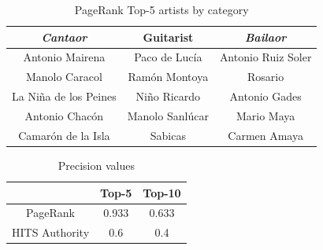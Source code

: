 \begin{table}[!ht]
    \centering
    \begin{tabular}{|c|c|c|}
    \hline
    \textit{Cantaor} & Guitarist & \textit{Bailaor} \\
    \hline
Antonio Mairena & Paco de Luc\'{i}a & Antonio Ruiz Soler \\
Manolo Caracol & Ram\'{o}n Montoya & Rosario \\
La Ni\~{n}a de los Peines & Ni\~{n}o Ricardo & Antonio Gades \\
Antonio Chac\'{o}n & Manolo Sanl\'{u}car & Mario Maya \\
Camar\'{o}n de la Isla & Sabicas & Carmen Amaya \\
    \hline
    \end{tabular}
    \caption{PageRank Top-5 artists by category}    
    \label{tbl:musicology:pagerank}
\end{table}



\begin{table}[!ht]
    \centering
    \begin{tabular}{|c|c|c|}
    \hline
    & Top-5 & Top-10 \\
    \hline
    PageRank & 0.933 & 0.633 \\
    HITS Authority & 0.6 & 0.4 \\
    \hline
    \end{tabular}
    \caption{Precision values}    
    \label{tbl:musicology:experts_results}
\end{table}

